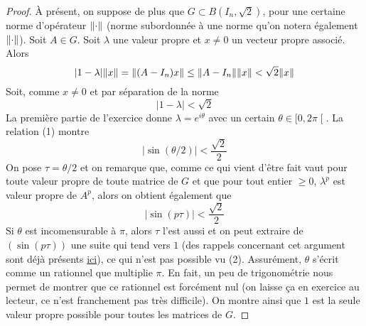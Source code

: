 \documentclass[10pt]{scrartcl}
\begin{document}
\begin{proof}
        À présent, on suppose de plus que $G\subset B(I_n,\sqrt2)$, pour une certaine 
        norme d'opérateur $\lVert \cdot\rVert$ (norme subordonnée à une norme qu'on notera 
        également $\lVert \cdot\rVert$). 
        Soit $A\in G$. 
        Soit $\lambda$ une valeur propre et $x\neq 0$ un vecteur propre associé. 
        Alors 
        \[
            |1-\lambda|\lVert x\rVert=\lVert (A-I_n)x\rVert\leq \lVert A-I_n\rVert\lVert x\rVert<\sqrt2\lVert x\rVert
        \]
        Soit, comme $x\neq 0$ et par séparation de la norme 
        \[
            |1-\lambda|<\sqrt2\tag*{(1)}
        \]
        La première partie de l'exercice donne $\lambda=e^{i\theta}$ avec 
        un certain $\theta\in\mathopen[0,2\pi\mathclose[$.
        La relation (1) montre 
        \[
            |\sin(\theta/2)|<\frac{\sqrt2}2
        \]
        On pose $\tau=\theta/2$ et on remarque que, comme ce qui vient d'être fait 
        vaut pour toute valeur propre de toute matrice de $G$ et que pour tout entier 
        $\geq 0$, $\lambda^p$ est valeur propre de $A^p$, alors on obtient également que 
        \[
            |\sin(p\tau)|<\frac{\sqrt2}2\tag*{(2)}
        \]
        Si $\theta$ est incomensurable à $\pi$, alors $\tau$ l'est aussi et  
        on peut extraire de $(\sin(p\tau))$ une suite qui tend vers $1$ (des rappels 
        concernant cet argument sont déjà présents \href{https://perso.eleves.ens-rennes.fr/people/amar.ahmane/src/colles/2024/s7/public_corr.pdf}{ici}), ce qui n'est pas possible vu (2).
        Assurément, $\theta$ s'écrit comme un rationnel que multiplie $\pi$. 
        En fait, un peu de trigonométrie nous permet de montrer que ce rationnel est 
        forcément nul (on laisse ça en exercice au lecteur, ce n'est franchement pas 
        très difficile). 
        On montre ainsi que $1$ est la seule valeur propre possible pour toutes les matrices
        de $G$.


\end{proof}
\end{document}
